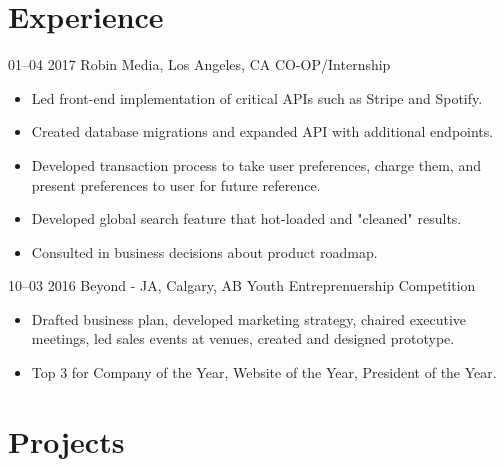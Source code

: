 \documentclass[]{friggeri-cv}
\begin{document}
\section{Experience}

\begin{entrylist}
	\entry
	{01–04 2017}
	{Robin Media, Los Angeles, CA}
	{CO-OP/Internship}
	{
		\begin{itemize}[leftmargin=*]
			\item Led front-end implementation of critical APIs such as Stripe and Spotify.
			\item Created database migrations and expanded API with additional endpoints.
			\item Developed transaction process to take user preferences, charge them, and present preferences to user for future reference.
			\item Developed global search feature that hot-loaded and "cleaned" results.
			\item Consulted in business decisions about product roadmap.
		\end{itemize}
	}
	\entry
	{10–03 2016}
	{Beyond - JA, Calgary, AB}
	{Youth Entreprenuership Competition}
	{
		\begin{itemize}[leftmargin=*]
			\item Drafted business plan, developed marketing strategy, chaired executive meetings, led sales events at venues, created and designed  prototype.
			\item Top 3 for Company of the Year, Website of the Year, President of the Year.
	\end{itemize}}
\end{entrylist}

\section{Projects}
\end{document}
